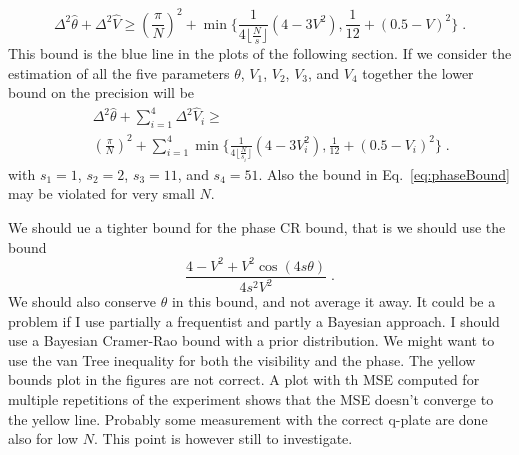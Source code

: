 \documentclass[aps, pra, 10pt, twocolumn, superscriptaddress,floatfix]{revtex4-1}
\begin{document}
%
\begin{equation}
	\Delta^2 \hat{\theta} + \Delta^2 \hat{V} \ge \left( \frac{\pi}{N} \right)^2 + \min \Big \lbrace \frac{1}{4 \lfloor \frac{N}{s} \rfloor} \left( 4 - 3 V^2 \right), \frac{1}{12} + \left( 0.5-V \right)^2\Big \rbrace \; .
	\label{eq:totalBound}
\end{equation}
%
This bound is the blue line in the plots of the following section. If we consider the estimation of all the five parameters $\theta$, $V_1$, $V_2$, $V_3$, and $V_4$ together the lower bound on the precision will be
%
\begin{eqnarray*}
	&& \Delta^2 \hat{\theta} + \sum_{i=1}^{4} \Delta^2 \hat{V}_i \ge \\ && \left( \frac{\pi}{N} \right)^2 + \sum_{i=1}^{4} \min \Big \lbrace \frac{1}{4 \lfloor \frac{N}{s_i} \rfloor} \left( 4 - 3 V_i^2 \right), \frac{1}{12} + \left( 0.5-V_i \right)^2 \Big \rbrace \; .
\end{eqnarray*}
%
with $s_1 = 1$, $s_2 = 2$, $s_3 = 11$, and $s_4 = 51$. Also the bound in Eq.~\eqref{eq:phaseBound} may be violated for very small $N$.

{\color{red} We should ue a tighter bound for the phase CR bound, that is we should use the bound
%
\begin{equation}
	\frac{4-V^2+V^2 \cos(4 s \theta)}{4 s^2 V^2} \; .
\end{equation}
%
We should also conserve $\theta$ in this bound, and not average it away. It could be a problem if I use partially a frequentist and partly a Bayesian approach. I should use a Bayesian Cramer-Rao bound with a prior distribution. We might want to use the van Tree inequality for both the visibility and the phase. The yellow bounds plot in the figures are not correct. A plot with th MSE computed for multiple repetitions of the experiment shows that the MSE doesn't converge to the yellow line. Probably some measurement with the correct q-plate are done also for low $N$. This point is however still to investigate.}
\end{document}
